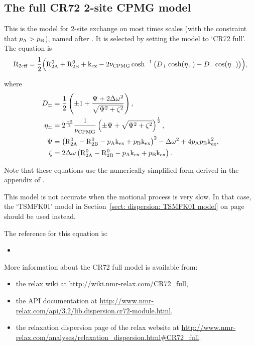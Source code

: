 
\subsection{The full CR72 2-site CPMG model}
\label{sect: dispersion: CR72 full model}

This is the model for 2-site exchange on most times scales (with the constraint that $p_{\textrm{A}} > p_{\textrm{B}}$), named after \citet{CarverRichards72}.
It is selected by setting the model to `CR72 full'.
The equation is
\begin{equation}
    \mathrm{R}_{\textrm{2eff}} = \frac{1}{2} \Big( \mathrm{R}_{\mathrm{2A}}^0 + \mathrm{R}_{\mathrm{2B}}^0 + \textrm{k}_{\textrm{ex}} - 2\nu_{\textrm{CPMG}}\cosh^{-1} \big( D_+\cosh(\eta_+) - D_-\cos(\eta_-) \big) \Big) ,
\end{equation}

where
\begin{align}
    D_{\pm}    &= \frac{1}{2} \left( \pm1 + \frac{\Psi + 2\Delta\omega^2}{\sqrt{\Psi^2 + \zeta^2}} \right) , \\
    \eta_{\pm} &= 2^{\frac{-3}{2}}\frac{1}{\nu_{\textrm{CPMG}}} \left( \pm\Psi + \sqrt{\Psi^2 + \zeta^2} \right)^{\frac{1}{2}} , \\
    \Psi       &= \left( \mathrm{R}_{\mathrm{2A}}^0 - \mathrm{R}_{\mathrm{2B}}^0 - p_{\textrm{A}}\textrm{k}_{\textrm{ex}} + p_{\textrm{B}}\textrm{k}_{\textrm{ex}} \right)^2 - \Delta\omega^2 + 4p_{\textrm{A}}p_{\textrm{B}}\textrm{k}_{\textrm{ex}}^2 , \\
    \zeta      &= 2\Delta\omega \left( \mathrm{R}_{\mathrm{2A}}^0 - \mathrm{R}_{\mathrm{2B}}^0 - p_{\textrm{A}}\textrm{k}_{\textrm{ex}} + p_{\textrm{B}}\textrm{k}_{\textrm{ex}} \right).
\end{align}

Note that these equations use the numerically simplified form derived in the appendix of \citet{Davis94}.

This model is not accurate when the motional process is very slow.
In that case, the `TSMFK01' model in Section~\ref{sect: dispersion: TSMFK01 model} on page~\pageref{sect: dispersion: TSMFK01 model} should be used instead.

The reference for this equation is:
\begin{itemize}
  \item {}
\end{itemize}

More information about the CR72 full model is available from:
\begin{itemize}
  \item the relax wiki at \url{http://wiki.nmr-relax.com/CR72\_full},
  \item the API documentation at \url{http://www.nmr-relax.com/api/3.2/lib.dispersion.cr72-module.html},
  \item the relaxation dispersion page of the relax website at \url{http://www.nmr-relax.com/analyses/relaxation\_dispersion.html#CR72\_full}.
\end{itemize}



